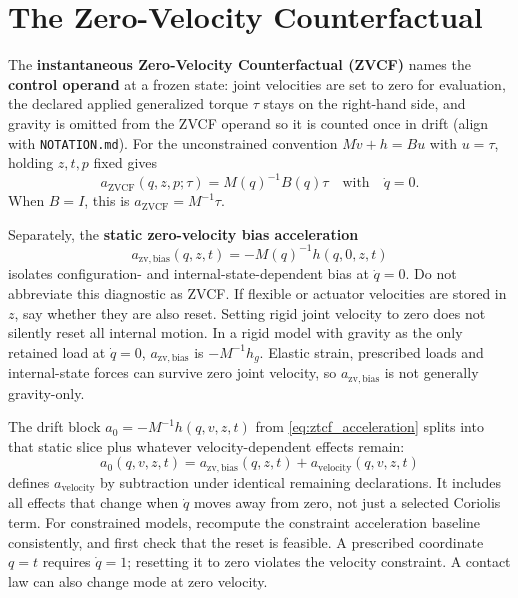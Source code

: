 \section{The Zero-Velocity Counterfactual}
\label{sec:zvcf}

The \textbf{instantaneous Zero-Velocity Counterfactual (ZVCF)} names the \textbf{control operand} at a frozen state: joint velocities are set to zero for evaluation, the declared applied generalized torque $\tau$ stays on the right-hand side, and gravity is omitted from the ZVCF operand so it is counted once in drift (align with \texttt{NOTATION.md}). For the unconstrained convention $M\dot v+h=Bu$ with $u=\tau$, holding $z,t,p$ fixed gives
\begin{equation}
a_{\mathrm{ZVCF}}(q,z,p;\tau)=M(q)^{-1}B(q)\tau
\quad\text{with}\quad \dot q=0.
\label{eq:zvcf_eom}
\end{equation}
When $B=I$, this is $a_{\mathrm{ZVCF}}=M^{-1}\tau$.

Separately, the \textbf{static zero-velocity bias acceleration}
\begin{equation}
a_{\mathrm{zv,bias}}(q,z,t)=-M(q)^{-1}h(q,0,z,t)
\label{eq:zv-bias}
\end{equation}
isolates configuration- and internal-state-dependent bias at $\dot q=0$. Do not abbreviate this diagnostic as ZVCF. If flexible or actuator velocities are stored in $z$, say whether they are also reset. Setting rigid joint velocity to zero does not silently reset all internal motion. In a rigid model with gravity as the only retained load at $\dot q=0$, $a_{\mathrm{zv,bias}}$ is $-M^{-1}h_g$. Elastic strain, prescribed loads and internal-state forces can survive zero joint velocity, so $a_{\mathrm{zv,bias}}$ is not generally gravity-only.

The drift block $a_0=-M^{-1}h(q,v,z,t)$ from \eqref{eq:ztcf_acceleration} splits into that static slice plus whatever velocity-dependent effects remain:
\begin{equation}
a_0(q,v,z,t)=a_{\mathrm{zv,bias}}(q,z,t)+a_{\mathrm{velocity}}(q,v,z,t)
\label{eq:drift_decomposition}
\end{equation}
defines $a_{\mathrm{velocity}}$ by subtraction under identical remaining declarations. It includes all effects that change when $\dot q$ moves away from zero, not just a selected Coriolis term. For constrained models, recompute the constraint acceleration baseline consistently, and first check that the reset is feasible. A prescribed coordinate $q=t$ requires $\dot q=1$; resetting it to zero violates the velocity constraint. A contact law can also change mode at zero velocity.

